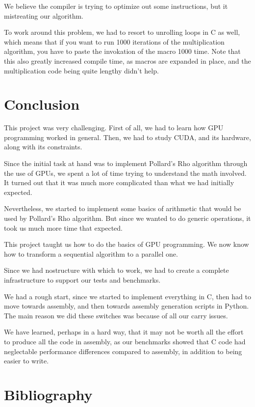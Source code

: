 \documentclass[12pt, a4paper]{report}
\begin{document}
We believe the compiler is trying to optimize out some instructions, but it mistreating
our algorithm.

To work around this problem, we had to resort to unrolling loops in C as well, which means that if you want to run
1000 iterations of the multiplication algorithm, you have to paste the invokation of the macro
1000 time.
Note that this also greatly increased compile time, as macros are expanded in place, and the multiplication
code being quite lengthy didn't help.

\chapter{Conclusion}
This project was very challenging.
First of all, we had to learn how GPU programming worked in general.
Then, we had to study CUDA, and its hardware, along with its constraints.

Since the initial task at hand was to implement Pollard's Rho algorithm through the use of
GPUs, we spent a lot of time trying to understand the math involved.
It turned out that it was much more complicated than what we had initially expected.

Nevertheless, we started to implement some basics of arithmetic that would be used
by Pollard's Rho algorithm.
But since we wanted to do generic operations, it took us much more time that expected.

This project taught us how to do the basics of GPU programming. We now know how to
transform a sequential algorithm to a parallel one.

Since we had nostructure with which to work, we had to create a complete infrastructure to
support our tests and benchmarks.

We had a rough start, since we started to implement everything in C, then had to move towards
assembly, and then towards assembly generation scripts in Python.
The main reason we did these switches was because of all our carry issues.

We have learned, perhaps in a hard way, that it may not be worth all the effort to
produce all the code in assembly, as our benchmarks showed that C code had neglectable
performance differences compared to assembly, in addition to being easier to write.

\chapter*{Bibliography}
\end{document}
